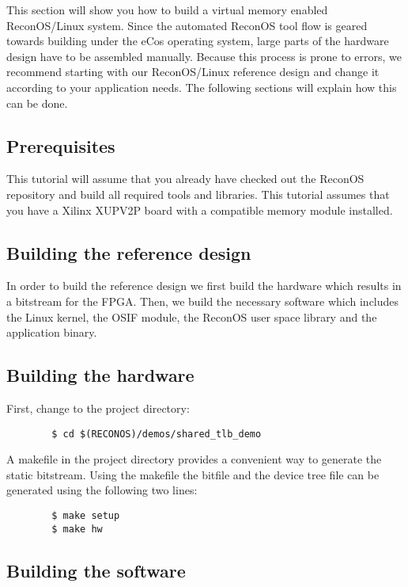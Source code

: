 \documentclass[DIV15,a4paper]{scrartcl}
\begin{document}
This section will show you how to build a virtual memory enabled ReconOS/Linux system. Since the automated ReconOS tool flow is geared towards
building under the eCos operating system, large parts of the hardware design have to be assembled manually. Because this process is prone to errors,
we recommend starting with our ReconOS/Linux reference design and change it according to your application needs. The following sections will explain
how this can be done.

\subsection{Prerequisites}

This tutorial will assume that you already have checked out the ReconOS repository and build all required tools and libraries.
This tutorial assumes that you have a Xilinx XUPV2P board with a compatible memory module installed.

\subsection{Building the reference design}

In order to build the reference design we first build the hardware which results in a bitstream for the FPGA. Then, we build the necessary software which includes
the Linux kernel, the OSIF module, the ReconOS user space library and the application binary.

\subsection*{Building the hardware}

First, change to the project directory:

\begin{verbatim}
        $ cd $(RECONOS)/demos/shared_tlb_demo
\end{verbatim}

A makefile in the project directory provides a convenient way to generate the static bitstream. Using the makefile the bitfile and the device tree file can be generated
using the following two lines:

\begin{verbatim}
        $ make setup
        $ make hw
\end{verbatim}

\subsection*{Building the software}
\end{document}
